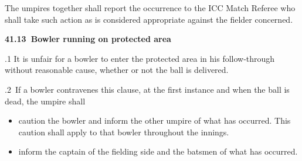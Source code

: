 \documentclass[12pt]{article}
\begin{document}
\vspace{\baselineskip}
\begin{adjustwidth}{0.5in}{0.07in}
{\fontsize{9pt}{10.8pt}\selectfont The umpires together shall report the occurrence to the ICC Match Referee who shall take such action as is considered appropriate against the fielder concerned.\par}\par

\end{adjustwidth}


\vspace{\baselineskip}
{\fontsize{11pt}{13.2pt}\selectfont \textbf{41.13\  Bowler running on protected area}\par}\par


\vspace{\baselineskip}
\begin{adjustwidth}{0.5in}{0.0in}
{\fontsize{9pt}{10.8pt}.1 It is unfair for a bowler to enter the protected area in his follow-through without reasonable cause, whether or not the ball is delivered.\par}\par

\end{adjustwidth}


\vspace{\baselineskip}
{\fontsize{9pt}{10.8pt}.2\  If a bowler contravenes this clause, at the first instance and when the ball is dead, the umpire shall\par}\par


\vspace{\baselineskip}
\begin{itemize}
	\item {\fontsize{9pt}{10.8pt}\selectfont caution the bowler and inform the other umpire of what has occurred. This caution shall apply to that bowler throughout the innings.\par}\par


\vspace{\baselineskip}
	\item {\fontsize{9pt}{10.8pt}\selectfont inform the captain of the fielding side and the batsmen of what has occurred.\par}
\end{itemize}\par
\end{document}
